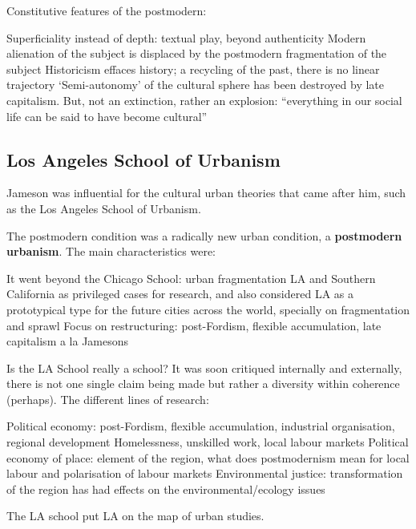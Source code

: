 \documentclass{article}
\begin{document}
Constitutive features of the postmodern:
\begin{outline}
	\1 Superficiality instead of depth: textual play, beyond authenticity
	\1 Modern alienation of the subject is displaced by the postmodern fragmentation of the subject
	\1 Historicism effaces history; a recycling of the past, there is no linear trajectory
	\1 `Semi-autonomy' of the cultural sphere has been destroyed by late capitalism. But, not an extinction, rather an explosion: ``everything in our social life can be said to have become cultural''
\end{outline}

\subsection{Los Angeles School of Urbanism}

Jameson was influential for the cultural urban theories that came after him, such as the Los Angeles School of Urbanism.

The postmodern condition was a radically new urban condition, a \textbf{postmodern urbanism}. The main characteristics were:

\begin{outline}
	\1 It went beyond the Chicago School: urban fragmentation
	\1 LA and Southern California as privileged cases for research, and also considered LA as a prototypical type for the future cities across the world, specially on fragmentation and sprawl
	\1 Focus on restructuring: post-Fordism, flexible accumulation, late capitalism a la Jamesons
\end{outline}

Is the LA School really a school? It was soon critiqued internally and externally, there is not one single claim being made but rather a diversity within coherence (perhaps). The different lines of research:

\begin{outline}
	\1 Political economy: post-Fordism, flexible accumulation, industrial organisation, regional development
	\1 Homelessness, unskilled work, local labour markets
	\1 Political economy of place: element of the region, what does postmodernism mean for local labour and polarisation of labour markets
	\1 Environmental justice: transformation of the region has had effects on the environmental/ecology issues
\end{outline}

The LA school put LA on the map of urban studies. 
\end{document}
